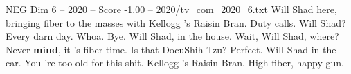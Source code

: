\begin{textsample}{NEG Dim 6 – 2020 – Score -1.00 – 2020/tv\_com\_2020\_6.txt}  \label{ex:f6_neg_056}
Will Shad here, bringing fiber to the masses with Kellogg 's Raisin Bran.
Duty calls.
Will Shad?
Every darn day.
Whoa.
Bye.
Will Shad, in the house.
Wait, Will Shad, where?
Never \textbf{mind}, it 's fiber time.
Is that DocuShih Tzu?
Perfect.
Will Shad in the car.
You 're too old for this shit.
Kellogg 's Raisin Bran.
High fiber, happy gun.

\end{textsample}
